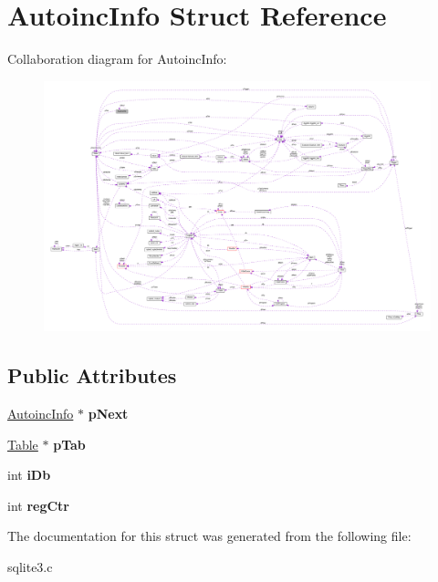 \hypertarget{struct_autoinc_info}{\section{Autoinc\-Info Struct Reference}
\label{struct_autoinc_info}
}


Collaboration diagram for Autoinc\-Info\-:\nopagebreak
\begin{figure}[H]
\begin{center}
\leavevmode
\includegraphics[width=350pt]{struct_autoinc_info__coll__graph}
\end{center}
\end{figure}
\subsection*{Public Attributes}
\begin{DoxyCompactItemize}
\item 
\hypertarget{struct_autoinc_info_aa77fb076beea013c25df4e49dba4b6f6}{\hyperlink{struct_autoinc_info}{Autoinc\-Info} $\ast$ {\bfseries p\-Next}}\label{struct_autoinc_info_aa77fb076beea013c25df4e49dba4b6f6}

\item 
\hypertarget{struct_autoinc_info_a0cf785b0cbaddb4215a8408f8e13075e}{\hyperlink{struct_table}{Table} $\ast$ {\bfseries p\-Tab}}\label{struct_autoinc_info_a0cf785b0cbaddb4215a8408f8e13075e}

\item 
\hypertarget{struct_autoinc_info_ae7234e0916b11ef97377bdfd6c7c4568}{int {\bfseries i\-Db}}\label{struct_autoinc_info_ae7234e0916b11ef97377bdfd6c7c4568}

\item 
\hypertarget{struct_autoinc_info_af180977ee7dcc8cab862185692f57cc5}{int {\bfseries reg\-Ctr}}\label{struct_autoinc_info_af180977ee7dcc8cab862185692f57cc5}

\end{DoxyCompactItemize}


The documentation for this struct was generated from the following file\-:\begin{DoxyCompactItemize}
\item 
sqlite3.\-c\end{DoxyCompactItemize}
